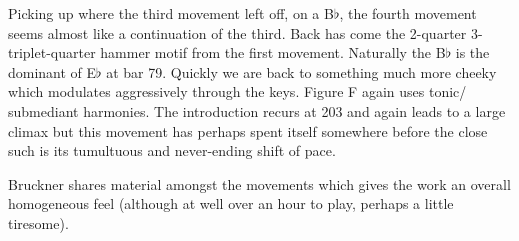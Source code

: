 Picking up where the third movement left off, on a B$\flat$, the fourth movement seems almost like a continuation of the third. Back has come the 2-quarter 3-triplet-quarter hammer motif from the first movement. Naturally the B$\flat$ is the dominant of E$\flat$ at bar 79. Quickly we are back to something much more cheeky which modulates aggressively through the keys. Figure F again uses tonic/ submediant harmonies.  The introduction recurs at 203 and again leads to a large climax but this movement has perhaps spent itself somewhere before the close such is its tumultuous and never-ending shift of pace. 

Bruckner shares material amongst the movements which gives the work an overall homogeneous feel (although at well over an hour to play, perhaps a little tiresome). 


